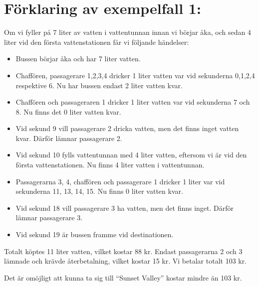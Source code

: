 \section*{Förklaring av exempelfall 1:}
Om vi fyller på 7 liter av vatten i vattentunnan innan vi börjar åka, och sedan 4 liter vid den första vattenstationen får vi följande händelser:

\begin{itemize}
  \item Bussen börjar åka och har 7 liter vatten.
  \item Chaffören, passagerare 1,2,3,4 dricker 1 liter vatten var vid sekunderna 0,1,2,4 respektive 6. Nu har bussen endast 2 liter vatten kvar.
  \item Chaffören och passageraren 1 dricker 1 liter vatten var vid sekunderna 7 och 8. Nu finns det 0 liter vatten kvar.
  \item Vid sekund 9 vill passagerare 2 dricka vatten, men det finns inget vatten kvar. Därför lämnar passagerare 2.
  \item Vid sekund 10 fylls vattentunnan med 4 liter vatten, eftersom vi är vid den första vattenstationen. Nu finns 4 liter vatten i vattentunnan.
  \item Passagerarna 3, 4, chaffören och passagerare 1 dricker 1 liter var vid sekunderna 11, 13, 14, 15. Nu finns 0 liter vatten kvar.
  \item Vid sekund 18 vill passagerare 3 ha vatten, men det finns inget. Därför lämnar passagerare 3.
  \item Vid sekund 19 är bussen framme vid destinationen.
\end{itemize}

Totalt köptes 11 liter vatten, vilket kostar 88 kr. Endast passagerarna 2 och 3 lämnade och krävde återbetalning, vilket kostar 15 kr.
Vi betalar totalt 103 kr.

Det är omöjligt att kunna ta sig till ``Sunset Valley'' kostar mindre än 103 kr. 

